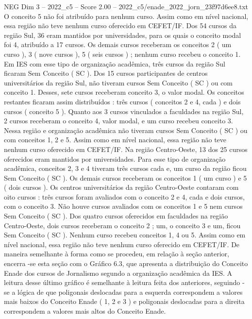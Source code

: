 \begin{textsample}{NEG Dim 3 – 2022\_c5 – Score 2.00 – 2022\_c5/enade\_2022\_jorn\_23f97d6ee8.txt}
O conceito 5 não foi atribuído para nenhum curso.
Assim como em nível nacional, essa região não teve nenhum curso oferecido em CEFET/IF.
Dos 54 cursos da região Sul, 36 eram mantidos por universidades, para os quais o conceito modal foi 4, atribuído a 17 cursos.
Os demais cursos receberam os conceitos 2 ( um curso ), 3 ( nove cursos ), 5 ( seis cursos ) ; nenhum curso recebeu o conceito 1.
Em IES com esse tipo de organização acadêmica, três cursos da região Sul ficaram Sem Conceito ( SC ).
Dos 15 cursos participantes de centros universitários da região Sul, não tiveram cursos Sem Conceito ( SC ) ou com conceito 1.
Desses, sete cursos receberam conceito 3, o valor modal.
Os conceitos restantes ficaram assim distribuídos : três cursos ( conceitos 2 e 4, cada ) e dois cursos ( conceito 5 ).
Quanto aos 3 cursos vinculados a faculdades na região Sul, 2 cursos receberam o conceito 4, valor modal, e um curso recebeu conceito 3.
Nessa região e organização acadêmica não tiveram cursos Sem Conceito ( SC ) ou com conceitos 1, 2 e 5.
Assim como em nível nacional, essa região não teve nenhum curso oferecido em CEFET/IF.
Na região Centro-Oeste, 13 dos 25 cursos oferecidos eram mantidos por universidades.
Para esse tipo de organização acadêmica, conceitos 2, 3 e 4 tiveram três cursos cada e, um curso da região ficou Sem Conceito ( SC ).
Os demais cursos receberam os conceitos 1 ( um curso ) e 5 ( dois cursos ).
Os centros universitários da região Centro-Oeste contaram com oito cursos : três cursos foram avaliados com o conceito 2 e 4, cada e dois cursos, com o conceito 3.
Não houve cursos avaliados com os conceitos 1 e 5 nem cursos Sem Conceito ( SC ).
Dos quatro cursos oferecidos em faculdades na região Centro-Oeste, dois cursos receberam o conceito 2 ; um, o conceito 3 e um, ficou Sem Conceito ( SC ).
Nenhum curso recebeu conceitos 1, 4 ou 5.
Assim como em nível nacional, essa região não teve nenhum curso oferecido em CEFET/IF.
De maneira semelhante à forma como se procedeu, em relação à seção anterior, encerra -se esta seção com o Gráfico 6.3, que apresenta a distribuição do Conceito Enade dos cursos de Jornalismo segundo a organização acadêmica da IES.
A leitura desse último gráfico é semelhante à leitura feita dos anteriores, seguindo -se a lógica de que poligonais deslocadas para a esquerda correspondem a valores mais baixos do Conceito Enade ( 1, 2 e 3 ) e poligonais deslocadas para a direita correspondem a valores mais altos do Conceito Enade.

\end{textsample}

